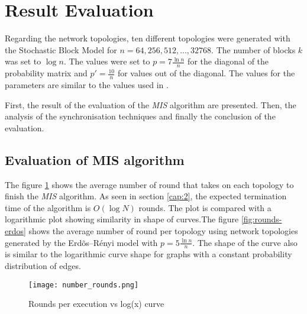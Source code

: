 \section{Result Evaluation}
\label{chap:6}
Regarding the network topologies, ten different topologies were generated with the Stochastic Block Model for $n = 64, 256, 512,..., 32768$. The number of blocks $k$ was set to $\log n$. The values were set to $p = 7{\tfrac {\ln n}{n}}$ for the diagonal of the probability matrix and  $p\prime = {\tfrac {10}{n}}$ for values out of the diagonal. The values for the parameters are similar to the values used in \cite{kothapalli2013analysis}.

First, the result of the evaluation of the \textit{MIS} algorithm are presented. Then, the analysis of the synchronisation techniques and finally the conclusion of the evaluation.



\subsection{Evaluation of MIS algorithm}

The figure \ref{fig:rounds_execution} shows the average number of round that takes on each topology to finish the \textit{MIS} algorithm. As seen in section \ref{cap:2}, the expected termination time of the algorithm is $O(\log N)$ rounds. The plot is compared with a logarithmic plot showing similarity in shape of curves.The figure \ref{fig:rounds-erdos} shows the average number of round per topology using network topologies generated by the Erd\~os--R\'enyi model with  $p = 5{\tfrac {\ln n}{n}}$. The shape of the curve also is similar to the logarithmic curve shape for graphs with a constant probability distribution of edges.


\begin{figure}[ht]
\centering
\texttt{[image: number\_rounds.png]} 
\caption{Rounds per execution vs log(x) curve}
\label{fig:rounds_execution}
\end{figure}




